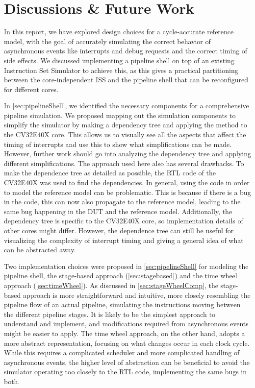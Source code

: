 \chapter{Discussions \& Future Work}
\label{Discussions} 
In this report, we have explored design choices for a cycle-accurate reference model, with the goal of accurately simulating the correct behavior of asynchronous events like interrupts and debug requests and the correct timing of side effects. We discussed implementing a pipeline shell on top of an existing Instruction Set Simulator to achieve this, as this gives a practical partitioning between the core-independent ISS and the pipeline shell that can be reconfigured for different cores. 

In \cref{sec:pipelineShell}, we identified the necessary components for a comprehensive pipeline simulation. We proposed mapping out the simulation components to simplify the simulator by making a dependency tree and applying the method to the CV32E40X core. This allows us to visually see all the aspects that affect the timing of interrupts and use this to show what simplifications can be made. However, further work should go into analyzing the dependency tree and applying different simplifications. The approach used here also has several drawbacks. To make the dependence tree as detailed as possible, the RTL code of the CV32E40X was used to find the dependencies. In general, using the code in order to model the reference model can be problematic. This is because if there is a bug in the code, this can now also propagate to the reference model, leading to the same bug happening in the DUT and the reference model. Additionally, the dependency tree is specific to the CV32E40X core, so implementation details of other cores might differ. However, the dependence tree can still be useful for visualizing the complexity of interrupt timing and giving a general idea of what can be abstracted away.

Two implementation choices were proposed in \cref{sec:pipelineShell} for modeling the pipeline shell, the stage-based approach (\cref{sec:stagebased}) and the time wheel approach (\cref{sec:timeWheel}). As discussed in \cref{sec:stageWheelComp}, the stage-based approach is more straightforward and intuitive, more closely resembling the pipeline flow of an actual pipeline, simulating the instructions moving between the different pipeline stages. It is likely to be the simplest approach to understand and implement, and modifications required from asynchronous events might be easier to apply. The time wheel approach, on the other hand, adopts a more abstract representation, focusing on what changes occur in each clock cycle. While this requires a complicated scheduler and more complicated handling of asynchronous events, the higher level of abstraction can be beneficial to avoid the simulator operating too closely to the RTL code, implementing the same bugs in both.


